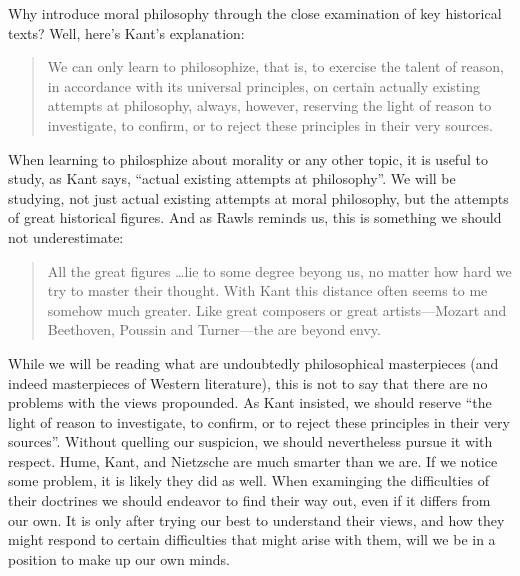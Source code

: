 Why introduce moral philosophy through the close examination of key historical texts? Well, here's Kant's explanation:
\begin{quote}
    We can only learn to philosophize, that is, to exercise the talent of reason, in accordance with its universal principles, on certain actually existing attempts at philosophy, always, however, reserving the light of reason to investigate, to confirm, or to reject these principles in their very sources.
\end{quote}
When learning to philosphize about morality or any other topic, it is useful to study, as Kant says, ``actual existing attempts at philosophy''. We will be studying, not just actual existing attempts at moral philosophy, but the attempts of great historical figures. And as Rawls reminds us, this is something we should not underestimate:
\begin{quote}
    All the great figures \ldots lie to some degree beyong us, no matter how hard we try to master their thought. With Kant this distance often seems to me somehow much greater. Like great composers or great artists---Mozart and Beethoven, Poussin and Turner---the are beyond envy.
\end{quote}
While we will be reading what are undoubtedly philosophical masterpieces (and indeed masterpieces of Western literature), this is not to say that there are no problems with the views propounded. As Kant insisted, we should reserve ``the light of reason to investigate, to confirm, or to reject these principles in their very sources''. Without quelling our suspicion, we should nevertheless pursue it with respect. Hume, Kant, and Nietzsche are much smarter than we are. If we notice some problem, it is likely they did as well. When examinging the difficulties of their doctrines we should endeavor to find their way out, even if it differs from our own. It is only after trying our best to understand their views, and how they might respond to certain difficulties that might arise with them, will we be in a position to make up our own minds. \change

% 

